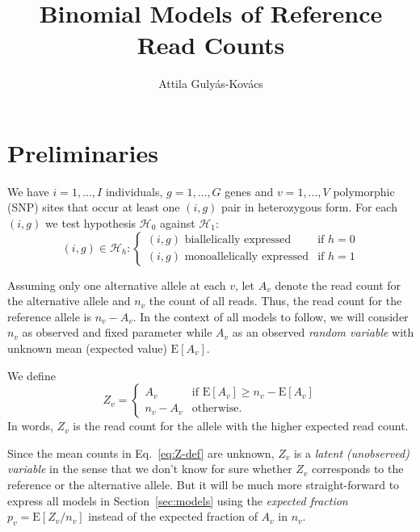 \documentclass[letterpaper]{article}
\title{Binomial Models of Reference Read Counts}
\author{Attila Gulyás-Kovács}
\begin{document}
\maketitle

\section{Preliminaries}

We have \(i=1,...,I\) individuals, \(g=1,...,G\) genes and \(v=1,...,V\)
polymorphic (SNP) sites that occur at least one \((i,g)\) pair in heterozygous form.  For
each \((i,g)\) we test hypothesis \(\mathcal{H}_0\) against \(\mathcal{H}_1\):
\begin{equation}
\label{eq:hypotheses}
(i,g) \in \mathcal{H}_h :
\begin{cases}
(i,g) \text{ biallelically expressed} & \text{if } h=0 \\
(i,g) \text{ monoallelically expressed} & \text{if } h=1
\end{cases}
\end{equation}

Assuming only one alternative allele at each \(v\), let \(A_v\) denote the
read count for the alternative allele and \(n_v\) the count of all reads.
Thus, the read count for the reference allele is \(n_v-A_v\). In the context
of all models to follow, we will consider \(n_v\) as observed and fixed
parameter while \(A_v\) as an observed \emph{random variable} with unknown
mean (expected value) \(\mathrm{E}[A_v]\).  

We define
\begin{equation}
\label{eq:Z-def}
Z_v =
\begin{cases}
A_v & \text{if } \mathrm{E}[A_v] \ge n_v-\mathrm{E}[A_v] \\
n_v-A_v & \text{otherwise}.
\end{cases}
\end{equation}
In words, \(Z_v\) is the read count for the allele with the higher expected
read count.

Since the mean counts in Eq.~\ref{eq:Z-def} are unknown, \(Z_v\) is a
\emph{latent (unobserved) variable} in the sense that we don't know for sure whether \(Z_v\) corresponds
to the reference or the alternative allele.  But it will be much more
straight-forward to express all models in Section~\ref{sec:models} using the
\emph{expected fraction} \(p_v=\mathrm{E}[Z_v/n_v]\) instead of the expected fraction
of \(A_v\) in \(n_v\).
\end{document}
